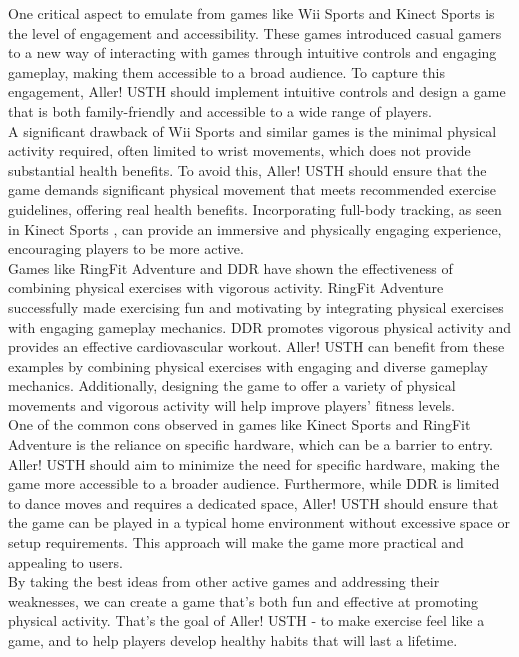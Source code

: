 \documentclass[12pt]{article}
\begin{document}
One critical aspect to emulate from games like Wii Sports and Kinect Sports  is the level of engagement and accessibility. These games introduced casual gamers to a new way of interacting with games through intuitive controls and engaging gameplay, making them accessible to a broad audience. To capture this engagement, Aller! USTH should implement intuitive controls and design a game that is both family-friendly and accessible to a wide range of players.\\

A significant drawback of Wii Sports and similar games is the minimal physical activity required, often limited to wrist movements, which does not provide substantial health benefits. To avoid this, Aller! USTH should ensure that the game demands significant physical movement that meets recommended exercise guidelines, offering real health benefits. Incorporating full-body tracking, as seen in Kinect Sports , can provide an immersive and physically engaging experience, encouraging players to be more active.\\

Games like RingFit Adventure and DDR have shown the effectiveness of combining physical exercises with vigorous activity. RingFit Adventure successfully made exercising fun and motivating by integrating physical exercises with engaging gameplay mechanics. DDR promotes vigorous physical activity and provides an effective cardiovascular workout. Aller! USTH can benefit from these examples by combining physical exercises with engaging and diverse gameplay mechanics. Additionally, designing the game to offer a variety of physical movements and vigorous activity will help improve players' fitness levels.\\

One of the common cons observed in games like Kinect Sports  and RingFit Adventure is the reliance on specific hardware, which can be a barrier to entry. Aller! USTH should aim to minimize the need for specific hardware, making the game more accessible to a broader audience. Furthermore, while DDR is limited to dance moves and requires a dedicated space, Aller! USTH should ensure that the game can be played in a typical home environment without excessive space or setup requirements. This approach will make the game more practical and appealing to users.\\

By taking the best ideas from other active games and addressing their weaknesses, we can create a game that's both fun and effective at promoting physical activity. That's the goal of Aller! USTH - to make exercise feel like a game, and to help players develop healthy habits that will last a lifetime.\\
\end{document}
